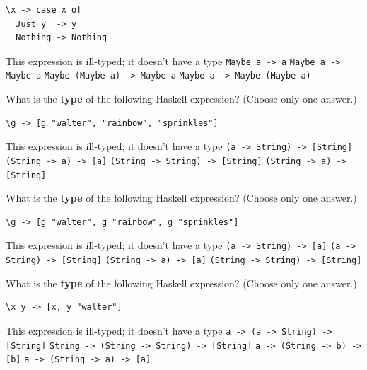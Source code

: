 \documentclass[addpoints]{exam}
\begin{document}
\begin{questions}
\begin{verbatim}
\x -> case x of
  Just y  -> y
  Nothing -> Nothing
\end{verbatim}

\begin{checkboxes}
  \choice This expression is ill-typed; it doesn't have a type
  \choice \verb|Maybe a -> a|
  \choice \verb|Maybe a -> Maybe a|
  \CorrectChoice \verb|Maybe (Maybe a) -> Maybe a|
  \choice \verb|Maybe a -> Maybe (Maybe a)|
\end{checkboxes}

\question[3] What is the \textbf{type} of the following Haskell expression? (Choose only one answer.)

\begin{verbatim}
\g -> [g "walter", "rainbow", "sprinkles"]
\end{verbatim}

\begin{checkboxes}
  \choice This expression is ill-typed; it doesn't have a type
  \choice \verb|(a -> String) -> [String]|
  \choice \verb|(String -> a) -> [a]|
  \CorrectChoice \verb|(String -> String) -> [String]|
  \choice \verb|(String -> a) -> [String]|
\end{checkboxes}

\newpage

\question[3] What is the \textbf{type} of the following Haskell expression? (Choose only one answer.)

\begin{verbatim}
\g -> [g "walter", g "rainbow", g "sprinkles"]
\end{verbatim}

\begin{checkboxes}
  \choice This expression is ill-typed; it doesn't have a type
  \choice \verb|(a -> String) -> [a]|
  \choice \verb|(a -> String) -> [String]|
  \CorrectChoice \verb|(String -> a) -> [a]|
  \choice \verb|(String -> String) -> [String]|
\end{checkboxes}

\question[3] What is the \textbf{type} of the following Haskell expression? (Choose only one answer.)

\begin{verbatim}
\x y -> [x, y "walter"]
\end{verbatim}

\begin{checkboxes}
  \choice This expression is ill-typed; it doesn't have a type
  \choice \verb|a -> (a -> String) -> [String]|
  \choice \verb|String -> (String -> String) -> [String]|
  \choice \verb|a -> (String -> b) -> [b]|
  \CorrectChoice \verb|a -> (String -> a) -> [a]|
\end{checkboxes}


\end{questions}
\end{document}
